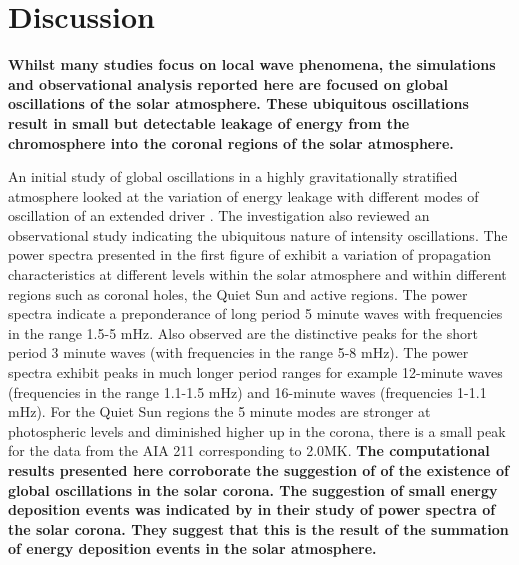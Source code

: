 \documentclass[physics,article,submit,pdftex,moreauthors]{Definitions/mdpi}
\begin{document}
\section{Discussion}
{\bf     Whilst many studies focus on local wave phenomena, the simulations and observational analysis reported here are focused on global oscillations of the solar atmosphere. These ubiquitous oscillations result in small but detectable leakage of energy from the chromosphere  into the coronal regions of the solar atmosphere.}

An initial study of global oscillations in a highly gravitationally stratified atmosphere looked at the variation of energy leakage with different modes of oscillation of an extended driver \cite{Griffiths2018b}. The investigation also reviewed an observational study indicating the ubiquitous nature of intensity oscillations. The power spectra presented in the first figure of \cite{Griffiths2018b} exhibit a variation of propagation characteristics at different levels within the solar atmosphere and within different regions such as coronal holes, the Quiet Sun and active regions. The power spectra indicate a preponderance of long period 5 minute waves with frequencies in the range 1.5-5 mHz. Also observed are the distinctive peaks for the short period 3 minute waves (with frequencies in the range 5-8 mHz). The power spectra exhibit  peaks in much longer period ranges for example 12-minute waves  (frequencies in the range 1.1-1.5 mHz)  and 16-minute waves (frequencies 1-1.1 mHz). For the Quiet Sun regions the 5 minute modes are stronger at photospheric levels and diminished higher up in the corona, there is a small peak for the data from the AIA 211 corresponding to 2.0MK. {\bf The computational results presented here corroborate the suggestion of \cite{Didkovsky2013} of the existence of global oscillations in the solar corona. The suggestion of small energy deposition events was indicated by \cite{Ireland2015} in their study of power spectra of the solar corona. They suggest that this is the result of the summation of energy deposition events in the solar atmosphere.} 
\end{document}
